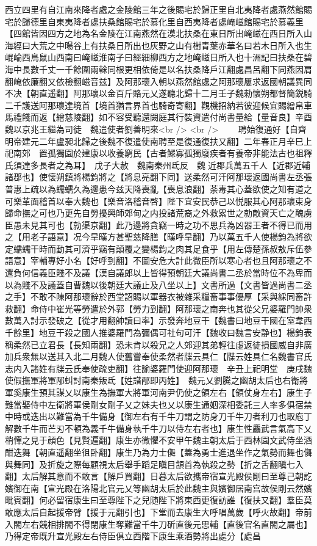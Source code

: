 西立四里有自江南來降者處之金陵館三年之後賜宅於歸正里自北夷降者處燕然館賜宅於歸德里自東夷降者處扶桑館賜宅於慕化里自西夷降者處崦嵫館賜宅於慕義里【四館皆因四方之地為名金陵在江南燕然在漠北扶桑在東日所出崦嵫在西日所入山海經曰大荒之中暘谷上有扶桑日所出也灰野之山有樹青葉赤華名曰若木日所入也生崐崘西鳥鼠山西南曰崦嵫淮南子曰經細柳西方之地崦嵫日所入也十洲記曰扶桑在碧海中長數千丈一千餘圍兩榦同根更相依倚是以名扶桑降戶江翻處昌呂翻下同燕因肩翻崦依廉翻又依檢翻嵫音兹】及阿那瓌入朝以燕然館處之阿那瓌屢求返國朝議異同不决【朝直遥翻】阿那瓌以金百斤賂元乂遂聽北歸十二月壬子魏勑懷朔都督簡鋭騎二千護送阿那瓌達境首【境首猶言界首也騎奇寄翻】觀機招納若彼迎候宜賜繒帛車馬禮餞而返【繒慈陵翻】如不容受聽還闕庭其行裝資遣付尚書量給【量音良】辛酉魏以京兆王繼為司徒　魏遣使者劉善明來<br />
<br />
　　聘始復通好【自齊明帝建元二年盧昶北歸之後魏不復遣使南聘至是復通復扶又翻】二年春正月辛巳上祀南郊　置孤獨園於建康以收養窮民【古者鰥寡孤獨廢疾者有養帝非能法古也祖釋氏須達多長者之為耳】　戊子大赦　魏南秦州氐反　魏近郡兵萬五千人【近郡近輔諸郡也】使懷朔鎮將楊鈞將之【將息亮翻下同】送柔然可汗阿那瓌返國尚書左丞張普惠上疏以為蠕蠕久為邊患今兹天降喪亂【喪息浪翻】荼毒其心蓋欲使之知有道之可樂革面稽首以奉大魏也【樂音洛稽音啓】陛下宜安民恭己以悦服其心阿那瓌束身歸命撫之可也乃更先自勞擾興師郊甸之内投諸荒裔之外救累世之勍敵資天亡之醜虜臣愚未見其可也【勍渠京翻】此乃邊將貪竊一時之功不思兵為凶器王者不得已而用之【用老子語意】况今旱暵方甚聖慈降膳【暵呼旱翻】乃以萬五千人使楊鈞為將欲定蠕蠕干時而動其可濟乎竊有顛覆之變楊鈞之肉其足食乎【用左傳楚孫叔敖斥伍參語意】宰輔專好小名【好呼到翻】不圖安危大計此微臣所以寒心者也且阿那瓌之不還負何信義臣賤不及議【漢自議郎以上皆得預朝廷大議尚書二丞於當時位不為卑而以為賤不及議蓋自曹魏以後朝廷大議止及八坐以上】文書所過【文書皆過尚書二丞之手】不敢不陳阿那瓌辭於西堂詔賜以軍器衣被雜采糧畜事事優厚【采與綵同畜許救翻】命侍中崔光等勞遣於外郭【勞力到翻】阿那瓌之南奔也其從父兄婆羅門帥衆數萬入討示發破之【從才用翻帥讀曰率】示發奔地豆干【魏書曰地豆干國在室韋西千餘里】地豆干殺之國人推婆羅門為彌偶可社句可汗【魏收曰魏言安静也】楊鈞表稱柔然已立君長【長知兩翻】恐未肯以殺兄之人郊迎其弟輕往虛返徒損國威自非廣加兵衆無以送其入北二月魏人使舊嘗奉使柔然者牒云具仁【牒云姓具仁名魏書官氏志内入諸姓有牒云氏奉使疏吏翻】往諭婆羅門使迎阿那瓌　辛丑上祀明堂　庚戌魏使假撫軍將軍邴虯討南秦叛氐【姓譜邴即丙姓】　魏元乂劉騰之幽胡太后也右衛將軍奚康生預其謀乂以康生為撫軍大將軍河南尹仍使之領左右【領仗身左右】康生子難當娶侍中左衛將軍侯剛女剛子乂之妹夫也乂以康生通姻深相委託三人率多俱宿禁中時或迭出以難當為千牛備身【御左右有千牛刀謂之防身刀千牛刀者利刀也取庖丁解數千牛而芒刃不頓為義千牛備身執千牛刀以侍左右者也】康生性麤武言氣高下乂稍憚之見于顔色【見賢遍翻】康生亦微懼不安甲午魏主朝太后于西林園文武侍坐酒酣迭舞【朝直遥翻坐徂卧翻】康生乃為力士儛【蓋為勇士進退坐作之氣勢而舞也儛與舞同】及折旋之際每顧視太后舉手蹈足瞋目頷首為執殺之勢【折之舌翻瞋七入翻】太后解其意而不敢言【解戶買翻】日暮太后欲攜帝宿宣光殿侯剛曰至尊己朝訖嬪御在南【宣光殿在洛陽北官元乂等幽胡太后於此魏主與嬪御居南宫故侯剛云然嬪毗賓翻】何必留宿康生曰至尊陛下之兒随陛下將東西更復訪誰【復扶又翻】羣臣莫敢應太后自起援帝臂【援于元翻引也】下堂而去康生大呼唱萬歲【呼火故翻】帝前入閤左右競相排閤不得閉康生奪難當千牛刀斫直後元思輔【直後官名直閤之屬也】乃得定帝既升宣光殿左右侍臣俱立西階下康生乘酒勢將出處分【處昌
